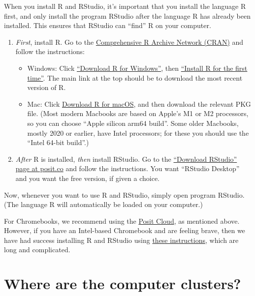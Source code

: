 \documentclass[
  a4paper,
]{book}
\providecommand{\tightlist}{%
  \setlength{\itemsep}{0pt}\setlength{\parskip}{0pt}}
\theoremstyle{definition}
\theoremstyle{definition}
\theoremstyle{definition}
\theoremstyle{definition}
\theoremstyle{remark}
\begin{document}
When you install R and RStudio, it's important that you install the language R first, and only install the program RStudio after the language R has already been installed. This ensures that RStudio can ``find'' R on your computer.

\begin{enumerate}
\def\labelenumi{\arabic{enumi}.}
\item
  \emph{First}, install R. Go to the \href{https://cran.r-project.org/}{Comprehensive R Archive Network (CRAN)} and follow the instructions:

  \begin{itemize}
  \tightlist
  \item
    Windows: Click \href{https://cran.r-project.org/bin/windows/}{``Download R for Windows''}, then \href{https://cran.r-project.org/bin/windows/base/}{``Install R for the first time''}. The main link at the top should be to download the most recent version of R.
  \item
    Mac: Click \href{https://cran.r-project.org/bin/macosx/}{Download R for macOS}, and then download the relevant PKG file. (Most modern Macbooks are based on Apple's M1 or M2 processors, so you can choose ``Apple silicon arm64 build''. Some older Macbooks, mostly 2020 or earlier, have Intel processors; for these you should use the ``Intel 64-bit build''.)
  \end{itemize}
\item
  \emph{After} R is installed, \emph{then} install RStudio. Go to the \href{https://posit.co/download/rstudio-desktop/}{``Download RStudio'' page at posit.co} and follow the instructions. You want ``RStudio Desktop'' and you want the free version, if given a choice.
\end{enumerate}

Now, whenever you want to use R and RStudio, simply open program RStudio. (The language R will automatically be loaded on your computer.)

For Chromebooks, we recommend using the \href{https://posit.cloud}{Posit Cloud}, as mentioned above. However, if you have an Intel-based Chromebook and are feeling brave, then we have had success installing R and RStudio using \href{https://levente.littvay.hu/chromebook/}{these instructions}, which are long and complicated.

\hypertarget{directions}{%
\section*{Where are the computer clusters?}\label{directions}}
\end{document}
